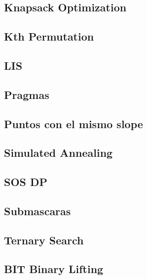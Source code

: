 \subsection{	Knapsack Optimization}
\raggedbottom
\hrulefill
\subsection{	Kth Permutation}
\raggedbottom
\hrulefill
\subsection{	LIS}
\raggedbottom
\hrulefill
\subsection{	Pragmas}
\raggedbottom
\hrulefill
\subsection{	Puntos con el mismo slope}
\raggedbottom
\hrulefill
\subsection{	Simulated Annealing}
\raggedbottom
\hrulefill
\subsection{	SOS DP}
\raggedbottom
\hrulefill
\subsection{	Submascaras}
\raggedbottom
\hrulefill
\subsection{	Ternary Search}
\raggedbottom
\hrulefill
\subsection{	BIT Binary Lifting}
\raggedbottom
\hrulefill


